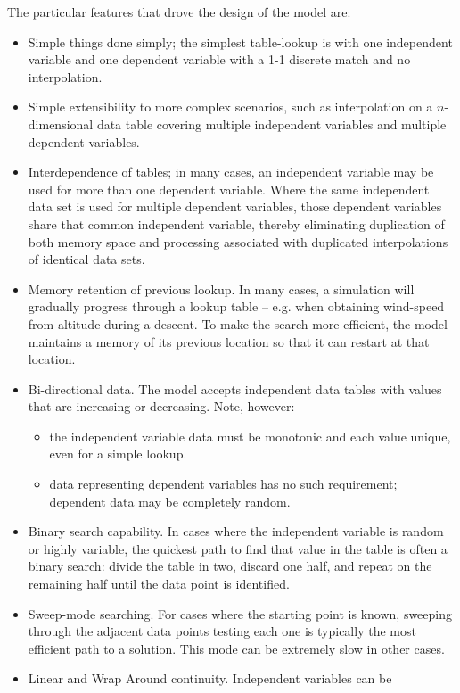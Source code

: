 \documentclass[11pt,fleqn]{report}
\begin{document}
The particular features that drove the design of the model are:
\begin{itemize}
 \item Simple things done simply; the simplest table-lookup is with one
 independent variable and one dependent variable with a 1-1 discrete match
 and no interpolation.
 \item Simple extensibility to more complex scenarios, such as interpolation
 on a $n$-dimensional data table covering multiple independent variables
 and multiple dependent variables.
 \item Interdependence of tables; in many cases, an independent variable may be
 used for more than one dependent variable.  Where the same independent
 data set is used for multiple dependent variables, those dependent variables
 share that common independent variable, thereby eliminating duplication
 of both memory space and processing associated with duplicated interpolations
 of identical data sets.
 \item Memory retention of previous lookup.  In many cases, a simulation will
 gradually progress through a lookup table -- e.g. when obtaining
 wind-speed from altitude during a descent.  To make the search more efficient,
 the model
 maintains a memory of its previous location so that it can restart at
 that location.
 \item Bi-directional data.  The model accepts independent data tables with
 values that are increasing or decreasing.  Note, however:
 \begin{itemize}
   \item the independent variable data must be monotonic and each value
         unique, even for a simple lookup.
   \item data representing dependent variables has no such requirement;
         dependent data may be completely random.
 \end{itemize}
 \item Binary search capability.  In cases where the independent variable is
 random or highly variable, the quickest path to find that value in the
 table is often a binary search: divide the table in two, discard one half,
 and repeat on the remaining half until the data point is identified.
 \item Sweep-mode searching.  For cases where the starting point is known,
 sweeping through the adjacent data points testing each one is typically
 the most efficient path to a solution.  This mode can be extremely slow in
 other cases.
 \item Linear and Wrap Around continuity. Independent variables can be

\end{itemize}
\end{document}
